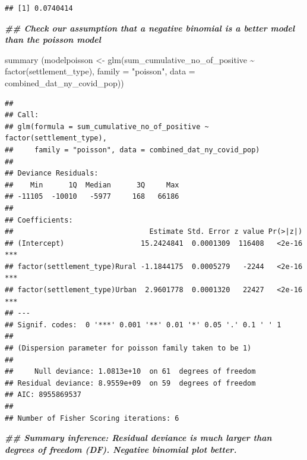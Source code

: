 \documentclass[
  12pt,
]{article}
\newenvironment{Shaded}{\begin{snugshade}}{\end{snugshade}}
\newcommand{\AttributeTok}[1]{\textcolor[rgb]{0.77,0.63,0.00}{#1}}
\newcommand{\CommentTok}[1]{\textcolor[rgb]{0.56,0.35,0.01}{\textit{#1}}}
\newcommand{\ConstantTok}[1]{\textcolor[rgb]{0.00,0.00,0.00}{#1}}
\newcommand{\DocumentationTok}[1]{\textcolor[rgb]{0.56,0.35,0.01}{\textbf{\textit{#1}}}}
\newcommand{\FunctionTok}[1]{\textcolor[rgb]{0.00,0.00,0.00}{#1}}
\newcommand{\NormalTok}[1]{#1}
\newcommand{\OtherTok}[1]{\textcolor[rgb]{0.56,0.35,0.01}{#1}}
\newcommand{\SpecialCharTok}[1]{\textcolor[rgb]{0.00,0.00,0.00}{#1}}
\newcommand{\StringTok}[1]{\textcolor[rgb]{0.31,0.60,0.02}{#1}}
\begin{document}
\begin{Shaded}
\end{Shaded}

\begin{verbatim}
## [1] 0.0740414
\end{verbatim}

\begin{Shaded}
\begin{Highlighting}[]
\DocumentationTok{\#\# Check our assumption that a negative binomial is a better model than the poisson model}

\FunctionTok{summary}\NormalTok{ (modelpoisson }\OtherTok{\textless{}{-}} \FunctionTok{glm}\NormalTok{(sum\_cumulative\_no\_of\_positive }\SpecialCharTok{\textasciitilde{}} \FunctionTok{factor}\NormalTok{(settlement\_type), }\AttributeTok{family =} \StringTok{"poisson"}\NormalTok{, }\AttributeTok{data =}\NormalTok{ combined\_dat\_ny\_covid\_pop))}
\end{Highlighting}
\end{Shaded}

\begin{verbatim}
## 
## Call:
## glm(formula = sum_cumulative_no_of_positive ~ factor(settlement_type), 
##     family = "poisson", data = combined_dat_ny_covid_pop)
## 
## Deviance Residuals: 
##    Min      1Q  Median      3Q     Max  
## -11105  -10010   -5977     168   66186  
## 
## Coefficients:
##                                Estimate Std. Error z value Pr(>|z|)    
## (Intercept)                  15.2424841  0.0001309  116408   <2e-16 ***
## factor(settlement_type)Rural -1.1844175  0.0005279   -2244   <2e-16 ***
## factor(settlement_type)Urban  2.9601778  0.0001320   22427   <2e-16 ***
## ---
## Signif. codes:  0 '***' 0.001 '**' 0.01 '*' 0.05 '.' 0.1 ' ' 1
## 
## (Dispersion parameter for poisson family taken to be 1)
## 
##     Null deviance: 1.0813e+10  on 61  degrees of freedom
## Residual deviance: 8.9559e+09  on 59  degrees of freedom
## AIC: 8955869537
## 
## Number of Fisher Scoring iterations: 6
\end{verbatim}

\begin{Shaded}
\begin{Highlighting}[]
\DocumentationTok{\#\# Summary inference: Residual deviance is much larger than degrees of freedom (DF). Negative binomial plot better.}
\end{Highlighting}
\end{Shaded}
\end{document}
